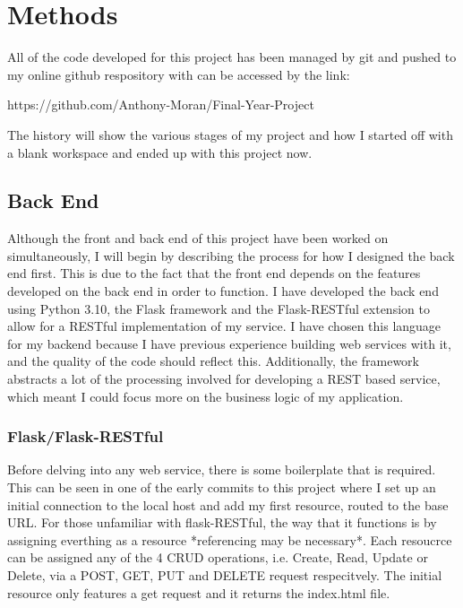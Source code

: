 \chapter{Methods}
\label{chapter2}

All of the code developed for this project has been managed by git and pushed to my online github respository with can be accessed by the link:

\begin{center}
    https://github.com/Anthony-Moran/Final-Year-Project
\end{center}

The history will show the various stages of my project and how I started off with a blank workspace and ended up with this project now.

\section{Back End}

Although the front and back end of this project have been worked on simultaneously, I will begin by describing the process for how I designed the back end first. This is due to the fact that the front end depends on the features developed on the back end in order to function.
I have developed the back end using Python 3.10, the Flask framework and the Flask-RESTful extension to allow for a RESTful implementation of my service. I have chosen this language for my backend because I have previous experience building web services with it, and the quality of the code should reflect this. Additionally, the framework abstracts a lot of the processing involved for developing a REST based service, which meant I could focus more on the business logic of my application.

\subsection{Flask/Flask-RESTful}

Before delving into any web service, there is some boilerplate that is required. This can be seen in one of the early commits to this project where I set up an initial connection to the local host and add my first resource, routed to the base URL. For those unfamiliar with flask-RESTful, the way that it functions is by assigning everthing as a resource *referencing may be necessary*. Each resoucrce can be assigned any of the 4 CRUD operations, i.e. Create, Read, Update or Delete, via a POST, GET, PUT and DELETE request respecitvely. The initial resource only features a get request and it returns the index.html file.

